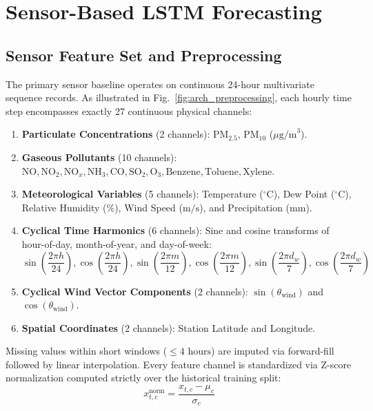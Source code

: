 \documentclass[conference]{IEEEtran}
\begin{document}
\section{Sensor-Based LSTM Forecasting}
\label{sec:lstm_forecaster}

\subsection{Sensor Feature Set and Preprocessing}
The primary sensor baseline operates on continuous 24-hour multivariate sequence records. As illustrated in Fig.~\ref{fig:arch_preprocessing}, each hourly time step encompasses exactly 27 continuous physical channels:
\begin{enumerate}
    \item \textbf{Particulate Concentrations} (2 channels): $\text{PM}_{2.5}$, $\text{PM}_{10}$ ($\mu\text{g/m}^3$).
    \item \textbf{Gaseous Pollutants} (10 channels): $\text{NO}, \text{NO}_2, \text{NO}_x, \text{NH}_3, \text{CO}, \text{SO}_2, \text{O}_3, \text{Benzene}, \text{Toluene}, \text{Xylene}$.
    \item \textbf{Meteorological Variables} (5 channels): Temperature ($^\circ\text{C}$), Dew Point ($^\circ\text{C}$), Relative Humidity (\%), Wind Speed ($\text{m/s}$), and Precipitation ($\text{mm}$).
    \item \textbf{Cyclical Time Harmonics} (6 channels): Sine and cosine transforms of hour-of-day, month-of-year, and day-of-week:
    \begin{equation}
    \sin\left(\frac{2\pi h}{24}\right), \cos\left(\frac{2\pi h}{24}\right), \sin\left(\frac{2\pi m}{12}\right), \cos\left(\frac{2\pi m}{12}\right), \sin\left(\frac{2\pi d_w}{7}\right), \cos\left(\frac{2\pi d_w}{7}\right)
    \end{equation}
    \item \textbf{Cyclical Wind Vector Components} (2 channels): $\sin(\theta_{\text{wind}})$ and $\cos(\theta_{\text{wind}})$.
    \item \textbf{Spatial Coordinates} (2 channels): Station Latitude and Longitude.
\end{enumerate}

Missing values within short windows ($\le 4\text{ hours}$) are imputed via forward-fill followed by linear interpolation. Every feature channel is standardized via Z-score normalization computed strictly over the historical training split:
\begin{equation}
x_{t, c}^{\text{norm}} = \frac{x_{t, c} - \mu_c}{\sigma_c}
\end{equation}
\end{document}
